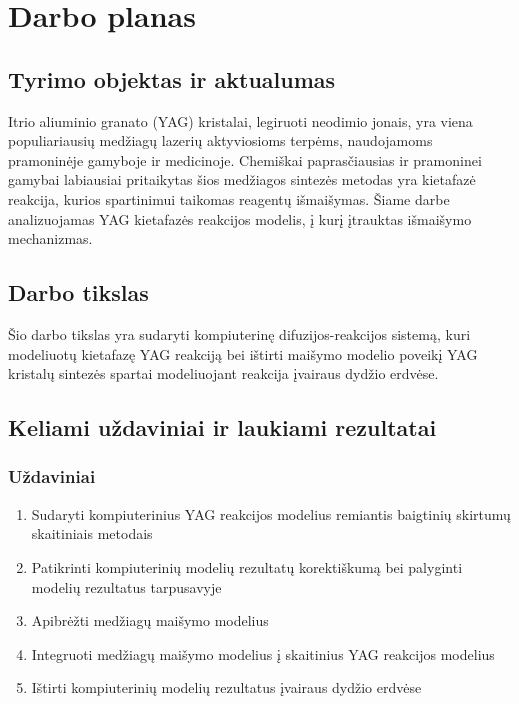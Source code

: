 \documentclass[]{VUMIFTemplateClass}
\begin{document}

\onehalfspacing


\section{Darbo planas}

\subsection{Tyrimo objektas ir aktualumas}

Itrio aliuminio granato (YAG) kristalai, legiruoti neodimio jonais, yra viena populiariausių medžiagų lazerių aktyviosioms terpėms, naudojamoms pramoninėje gamyboje ir medicinoje. Chemiškai paprasčiausias ir pramoninei gamybai labiausiai pritaikytas šios medžiagos sintezės metodas yra kietafazė reakcija, kurios spartinimui taikomas reagentų išmaišymas. Šiame darbe analizuojamas YAG kietafazės reakcijos modelis, į kurį įtrauktas išmaišymo mechanizmas.

\subsection{Darbo tikslas}

Šio darbo tikslas yra sudaryti kompiuterinę difuzijos-reakcijos sistemą, kuri modeliuotų kietafazę YAG reakciją bei ištirti maišymo modelio poveikį YAG kristalų sintezės spartai modeliuojant reakcija įvairaus dydžio erdvėse.

\subsection{Keliami uždaviniai ir laukiami rezultatai}
\subsubsection{Uždaviniai}
\begin{enumerate}
  
    \item Sudaryti kompiuterinius YAG reakcijos modelius remiantis baigtinių skirtumų skaitiniais metodais
    \item Patikrinti kompiuterinių modelių rezultatų korektiškumą bei palyginti modelių rezultatus tarpusavyje
    \item Apibrėžti medžiagų maišymo modelius
    \item Integruoti medžiagų maišymo modelius į skaitinius YAG reakcijos modelius
    \item Ištirti kompiuterinių modelių rezultatus įvairaus dydžio erdvėse
\end{enumerate}
\end{document}
